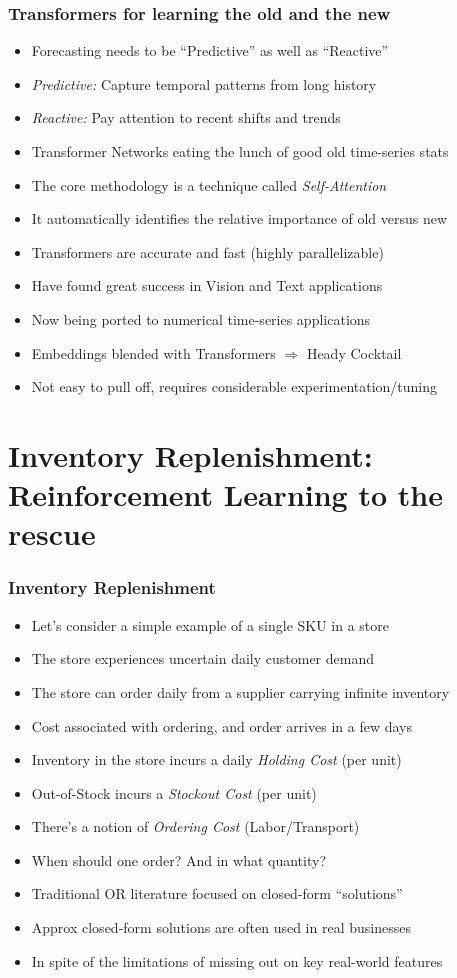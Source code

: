 \documentclass[handout]{beamer}
\begin{document}
\begin{frame}
\frametitle{Transformers for learning the old and the new}
\pause
\begin{itemize}[<+->]
\item Forecasting needs to be ``Predictive'' as well as ``Reactive''
\item {\em Predictive:} Capture temporal patterns from long history
\item {\em Reactive:} Pay attention to recent shifts and trends
\item Transformer Networks eating the lunch of good old time-series stats
\item The core methodology is a technique called {\em Self-Attention}
\item It automatically identifies the relative importance of old versus new
\item Transformers are accurate and fast (highly parallelizable)
\item Have found great success in Vision and Text applications
\item Now being ported to numerical time-series applications
\item Embeddings blended with Transformers $\Rightarrow$ Heady Cocktail
\item Not easy to pull off, requires considerable experimentation/tuning
\end{itemize}
\end{frame}

\section{Inventory Replenishment: Reinforcement Learning to the rescue}


\begin{frame}
\frametitle{Inventory Replenishment}
\pause
\begin{itemize}[<+->]
\item Let's consider a simple example of a single SKU in a store
\item The store experiences uncertain daily customer demand
\item The store can order daily from a supplier carrying infinite inventory
\item Cost associated with ordering, and order arrives in a few days
\item Inventory in the store incurs a daily {\em Holding Cost} (per unit)
\item Out-of-Stock incurs a {\em Stockout Cost} (per unit)
\item There's a notion of {\em Ordering Cost} (Labor/Transport)
\item When should one order? And in what quantity?
\item Traditional OR literature focused on closed-form ``solutions''
\item Approx closed-form solutions are often used in real businesses
\item In spite of the limitations of missing out on key real-world features
\end{itemize}
\end{frame}
\end{document}
